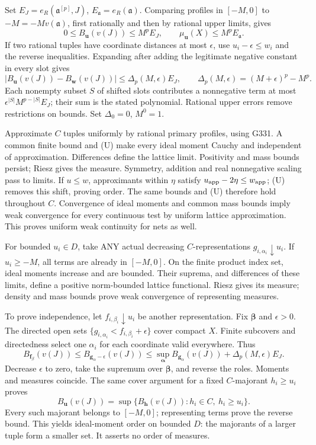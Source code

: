 \documentclass[11pt]{article}
\begin{document}
Set \(E_J=e_R(\mathfrak a^{[p]},J)\), \(E_{\mathfrak a}=e_R(\mathfrak a)\). Comparing profiles in \([-M,0]\) to \(-M=-Mv(\mathfrak a)\), first rationally and then by rational upper limits, gives
\[
0\le B_{\boldsymbol u}(v(J))\le M^pE_J,\qquad
\mu_{\boldsymbol u}(X)\le M^p E_{\mathfrak a}.
\]
If two rational tuples have coordinate distances at most \(\epsilon\), use \(u_i-\epsilon\le w_i\) and the reverse inequalities. Expanding after adding the legitimate negative constant in every slot gives
\[
|B_{\boldsymbol u}(v(J))-B_{\boldsymbol w}(v(J))|
\le\Delta_p(M,\epsilon)E_J,\qquad
\Delta_p(M,\epsilon)=(M+\epsilon)^p-M^p. \tag{U}
\]
Each nonempty subset \(S\) of shifted slots contributes a nonnegative term at most \(\epsilon^{|S|}M^{p-|S|}E_J\); their sum is the stated polynomial. Rational upper errors remove restrictions on bounds. Set \(\Delta_0=0\), \(M^0=1\).

Approximate \(C\) tuples uniformly by rational primary profiles, using G331. A common finite bound and (U) make every ideal moment Cauchy and independent of approximation. Differences define the lattice limit. Positivity and mass bounds persist; Riesz gives the measure. Symmetry, addition and real nonnegative scaling pass to limits. If \(u\le w\), approximants within \(\eta\) satisfy \(u_{\rm app}-2\eta\le w_{\rm app}\); (U) removes this shift, proving order. The same bounds and (U) therefore hold throughout \(C\). Convergence of ideal moments and common mass bounds imply weak convergence for every continuous test by uniform lattice approximation. This proves uniform weak continuity for nets as well.

For bounded \(u_i\in D\), take ANY actual decreasing \(C\)-representations \(g_{i,\alpha_i}\downarrow u_i\). If \(u_i\ge-M\), all terms are already in \([-M,0]\). On the finite product index set, ideal moments increase and are bounded. Their suprema, and differences of these limits, define a positive norm-bounded lattice functional. Riesz gives its measure; density and mass bounds prove weak convergence of representing measures.

To prove independence, let \(f_{i,\beta_i}\downarrow u_i\) be another representation. Fix \(\boldsymbol\beta\) and \(\epsilon>0\). The directed open sets \(\{g_{i,\alpha_i}<f_{i,\beta_i}+\epsilon\}\) cover compact \(X\). Finite subcovers and directedness select one \(\alpha_i\) for each coordinate valid everywhere. Thus
\[
B_{\boldsymbol f_\beta}(v(J))
\le B_{\boldsymbol g_\alpha-\epsilon}(v(J))
\le\sup_{\boldsymbol\alpha}B_{\boldsymbol g_\alpha}(v(J))+\Delta_p(M,\epsilon)E_J.
\]
Decrease \(\epsilon\) to zero, take the supremum over \(\boldsymbol\beta\), and reverse the roles. Moments and measures coincide. The same cover argument for a fixed \(C\)-majorant \(h_i\ge u_i\) proves
\[
B_{\boldsymbol u}(v(J))
=\sup\{B_{\boldsymbol h}(v(J)):h_i\in C,\ h_i\ge u_i\}. \tag{M}
\]
Every such majorant belongs to \([-M,0]\); representing terms prove the reverse bound. This yields ideal-moment order on bounded \(D\): the majorants of a larger tuple form a smaller set. It asserts no order of measures.
\end{document}
